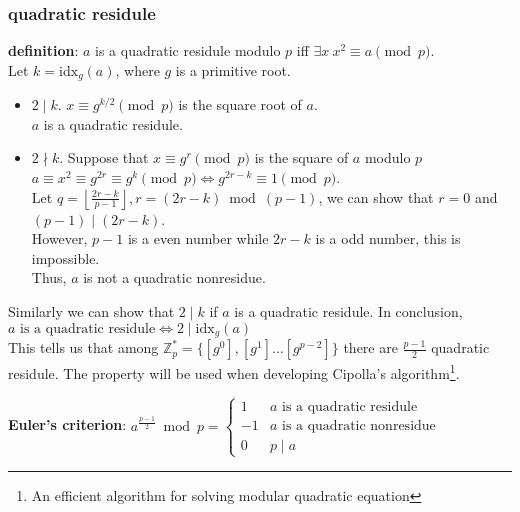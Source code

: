 \documentclass{article}
\newcommand{\ZZ}{\mathbb{Z}}
\newcommand{\floor}[1]{\left\lfloor{#1}\right\rfloor}
\newcommand{\idx}{\mathrm{idx}}
\begin{document}
\subsubsection{quadratic residule}


\noindent \textbf{definition}: $a$ is a quadratic residule modulo $p$ iff $\exists x\ x^2\equiv a\pmod p$.\\

Let $k=\idx_g(a)$, where $g$ is a primitive root.
\begin{itemize}
	\item $2\mid k$. $x\equiv g^{k/2}\pmod p$ is the square root of $a$.\\
		$a$ is a quadratic residule.
	\item $2\nmid k$. Suppose that $x\equiv g^r\pmod p$ is the square of $a$ modulo $p$\\
		$a\equiv x^2\equiv g^{2r}\equiv g^{k}\pmod p\iff g^{2r-k}\equiv 1\pmod p$.\\
		Let $q=\floor{\frac{2r-k}{p-1}},r=(2r-k)\bmod {(p-1)}$, we can show that $r=0$ and $(p-1)\mid (2r-k)$.\\
		However, $p-1$ is a even number while $2r-k$ is a odd number, this is impossible.\\
		Thus, $a$ is not a quadratic nonresidue.
\end{itemize}

Similarly we can show that $2\mid k$ if $a$ is a quadratic residule.
In conclusion, $a\text{ is a quadratic residule} \iff 2\mid \mathrm{idx}_g(a)$\\

This tells us that among $\ZZ_p^\ast=\{[g^0],[g^1]\ldots [g^{p-2}]\}$ there are $\frac{p-1}{2}$ quadratic residule. 
The property will be used when developing Cipolla's algorithm\footnote{An efficient algorithm for solving modular quadratic equation}.



\noindent \textbf{Euler's criterion}: $a^{\frac{p-1}{2}}\bmod p=\begin{cases}1 & a \text{ is a quadratic residule}\\ -1& a\text{ is a quadratic nonresidue}\\ 0 & p\mid a\end{cases}$
\end{document}

